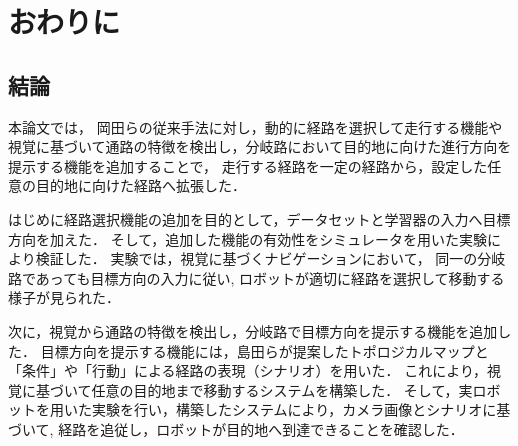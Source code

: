 \chapter{おわりに}
\label{chap:end}
\section{結論}
本論文では，
岡田らの従来手法に対し，動的に経路を選択して走行する機能や
視覚に基づいて通路の特徴を検出し，分岐路において目的地に向けた進行方向を提示する機能を追加することで，
走行する経路を一定の経路から，設定した任意の目的地に向けた経路へ拡張した．

はじめに経路選択機能の追加を目的として，データセットと学習器の入力へ目標方向を加えた．
そして，追加した機能の有効性をシミュレータを用いた実験により検証した．
実験では，視覚に基づくナビゲーションにおいて，
同一の分岐路であっても目標方向の入力に従い, 
ロボットが適切に経路を選択して移動する様子が見られた．

次に，視覚から通路の特徴を検出し，分岐路で目標方向を提示する機能を追加した．
目標方向を提示する機能には，島田らが提案したトポロジカルマップと
「条件」や「行動」による経路の表現（シナリオ）を用いた．
これにより，視覚に基づいて任意の目的地まで移動するシステムを構築した．
そして，実ロボットを用いた実験を行い，構築したシステムにより，カメラ画像とシナリオに基づいて, 
経路を追従し，ロボットが目的地へ到達できることを確認した．

